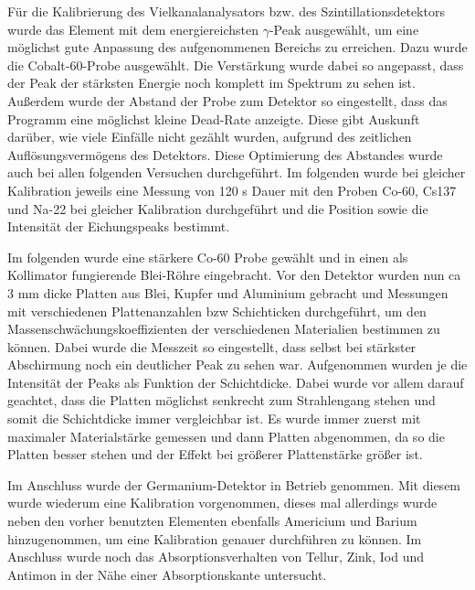 \documentclass[
	parskip=half,10pt,
	numbers= noenddot, %
	toc=flat, %
	oneside,
	twocolumn,
	]{scrartcl}
\begin{document}
Für die Kalibrierung des Vielkanalanalysators bzw. des Szintillationsdetektors wurde das Element mit dem energiereichsten 
$\gamma$-Peak ausgewählt, um eine möglichst gute Anpassung des aufgenommenen Bereichs zu erreichen. 
Dazu wurde die Cobalt-60-Probe ausgewählt. Die Verstärkung wurde dabei so angepasst, dass der Peak der stärksten Energie noch 
komplett im Spektrum zu sehen ist. Außerdem wurde der Abstand der Probe zum Detektor so eingestellt, dass das Programm eine möglichst 
kleine Dead-Rate anzeigte. Diese gibt Auskunft darüber, wie viele Einfälle nicht gezählt wurden, aufgrund des zeitlichen 
Auflösungsvermögens des Detektors. Diese Optimierung des Abstandes wurde auch bei allen folgenden Versuchen durchgeführt. 
Im folgenden wurde bei gleicher Kalibration jeweils eine Messung von 120 s Dauer mit den Proben 
Co-60, Cs137 und Na-22 bei gleicher Kalibration durchgeführt und die Position sowie die Intensität der Eichungspeaks bestimmt. 

Im folgenden wurde eine stärkere Co-60 Probe gewählt und in einen als Kollimator fungierende Blei-Röhre eingebracht. Vor den Detektor 
wurden nun ca 3 mm dicke Platten aus Blei, Kupfer und Aluminium gebracht und Messungen mit verschiedenen Plattenanzahlen bzw Schichticken 
durchgeführt, um den Massenschwächungskoeffizienten der verschiedenen Materialien bestimmen zu können. Dabei wurde die Messzeit so 
eingestellt, dass selbst bei stärkster Abschirmung noch ein deutlicher Peak zu sehen war. Aufgenommen wurden je die Intensität der 
Peaks als Funktion der Schichtdicke. Dabei wurde vor allem darauf geachtet, dass die Platten möglichst senkrecht zum Strahlengang stehen 
und somit die Schichtdicke immer vergleichbar ist. Es wurde immer zuerst mit maximaler Materialstärke gemessen und dann Platten 
abgenommen, da so die Platten besser stehen und der Effekt bei größerer Plattenstärke größer ist. 

Im Anschluss wurde der Germanium-Detektor in Betrieb genommen. Mit diesem wurde wiederum eine Kalibration vorgenommen, dieses mal allerdings wurde neben den 
vorher benutzten Elementen ebenfalls Americium und Barium hinzugenommen, um eine Kalibration genauer durchführen zu können. Im Anschluss wurde 
noch das Absorptionsverhalten von Tellur, Zink, Iod und Antimon in der Nähe einer Absorptionskante untersucht. 

%
\end{document}
